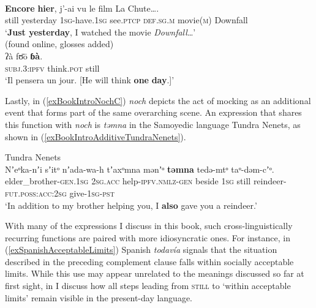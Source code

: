 \begin{exe}
	\ex {}\label{exBookIntroTimeScalar}\\
	\gll \textbf{Encore} \textbf{hier}, j'-ai vu le film {La Chute}….\\
	still yesterday 1\textsc{sg}-have.1\textsc{sg} see.\textsc{ptcp} \textsc{def}.\textsc{sg}.\textsc{m} movie(\textsc{m}) Downfall\\
	\glt \lq \textbf{Just yesterday}, I watched the movie \textit{Downfall}…'
	\\(found online, glosses added)%
		\ex\label{exBookIntroProspective}\\
		\gll ʔà fʊ̄ō \textbf{ɓà}.\\
		\textsc{subj}.3:\textsc{ipfv} think.\textsc{pot} still\\
		\glt \lq Il pensera un jour. [He will think \textbf{one} \textbf{day}.]' \parencite[382]{Elders2000}
\end{exe}

Lastly,  in (\ref{exBookIntroNochC}) \textit{noch} depicts the act of mocking as an additional event that forms part of the same overarching scene. An expression that shares this function with \textit{noch} is \textit{təmna} in the Samoyedic language Tundra Nenets, as shown in (\ref{exBookIntroAdditiveTundraNenets}).

\begin{exe}
		\ex Tundra Nenets\label{exBookIntroAdditiveTundraNenets}\\
		\gll Nʼeᵒka-nʼi sʼitᵒ nʼada-wa-h tʼaxᵒmna mənʼᵒ \textbf{təmna} tedə-mtᵒ taᵒ-dəm-cʼᵒ.\\
		elder\_brother-\textsc{gen}.1\textsc{sg} 2\textsc{sg}.\textsc{acc} help-\textsc{ipfv}.\textsc{nmlz}-\textsc{gen} beside 1\textsc{sg} still reindeer-\textsc{fut.poss}:\textsc{acc}:2\textsc{sg} give-1\textsc{sg}-\textsc{pst}\\
		\glt \lq In addition to my brother helping you, I \textbf{also} gave you a reindeer.' \parencite[371]{Nikolaeva2014}
\end{exe}

With many of the expressions I discuss in this book, such cross-linguistically recurring functions are paired with more idiosyncratic ones. For instance, in (\ref{exSpanishAcceptableLimits}) Spanish \textit{todavía} signals that the situation described in the preceding complement clause falls within socially acceptable limits. While this use may appear unrelated to the meanings discussed so far at first sight, in  I discuss how all steps leading from \textsc{still} to \lq within acceptable limits\rq{ }remain visible in the present-day language.

